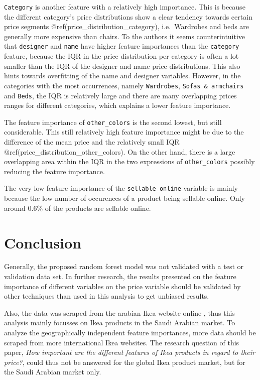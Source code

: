 \documentclass[a4paper, nobind]{templates/ociamthesis}
\begin{document}
\texttt{Category} is another feature with a relatively high importance. This is because the different category's price distributions show a clear tendency towards certain price segments @ref(price\_distribution\_category), i.e.~Wardrobes and beds are generally more expensive than chairs.
To the authors it seems counterintuitive that \texttt{designer} and \texttt{name} have higher feature importances than the \texttt{category} feature, because the IQR in the price distribution per category is often a lot smaller than the IQR of the designer and name price distributions. This also hints towards overfitting of the name and designer variables. However, in the categories with the most occurrences, namely \texttt{Wardrobes}, \texttt{Sofas\ \&\ armchairs} and \texttt{Beds}, the IQR is relatively large and there are many overlapping prices ranges for different categories, which explains a lower feature importance.

The feature importance of \texttt{other\_colors} is the second lowest, but still considerable. This still relatively high feature importance might be due to the difference of the mean price and the relatively small IQR @ref(price\_distribution\_other\_colors). On the other hand, there is a large overlapping area within the IQR in the two expressions of \texttt{other\_colors} possibly reducing the feature importance.

The very low feature importance of the \texttt{sellable\_online} variable is mainly because the low number of occurences of a product being sellable online. Only around 0.6\% of the products are sellable online.

\hypertarget{conclusion}{%
\section{Conclusion}\label{conclusion}}

Generally, the proposed random forest model was not validated with a test or validation data set. In further research, the results presented on the feature importance of different variables on the price variable should be validated by other techniques than used in this analysis to get unbiased results.

Also, the data was scraped from the arabian Ikea website online , thus this analysis mainly focusses on Ikea products in the Saudi Arabian market. To analyze the geographically independent feature importances, more data should be scraped from more international Ikea websites. The research question of this paper, \emph{How important are the different features of Ikea products in regard to their price?}, could thus not be answered for the global Ikea product market, but for the Saudi Arabian market only.
\end{document}
